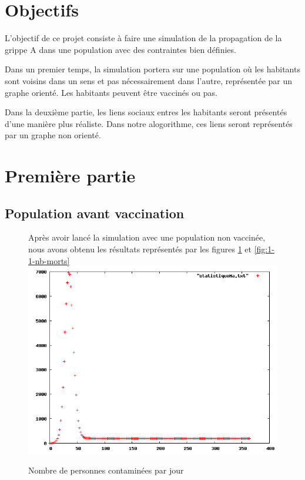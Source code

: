 \documentclass[12pt,a4paper,titlepage]{report}
\begin{document}

{}
\renewcommand\headrulewidth{2pt}


\section*{Objectifs}
\thispagestyle{fancy}
\par L'objectif de ce projet consiste à faire une simulation de la propagation de la grippe A dans une population avec des contraintes bien définies. 
\par Dans un premier temps, la simulation portera sur une population où les habitants sont voisins dans un sens et pas nécessairement dans l'autre, représentée par un graphe orienté. Les habitants peuvent être vaccinés ou pas. 
\par Dans la deuxième partie, les liens sociaux entres les habitants seront présentés d'une manière plus réaliste. Dans notre alogorithme, ces liens seront représentés par un graphe non orienté.


\section*{Première partie}
\subsection*{Population avant vaccination}
\begin{figure}[h]
Après avoir lancé la simulation avec une population non vaccinée, nous avons obtenu 
les résultats représentés par les figures \ref{fig:1-1-nb-malades} et \ref{fig:1-1-nb-morts}   
  \centering
  \includegraphics[width=15cm]{1-1-statistiqueMa.png}
  \caption{Nombre de personnes contaminées par jour}
  \label{fig:1-1-nb-malades}
\end{figure}
\end{document}

